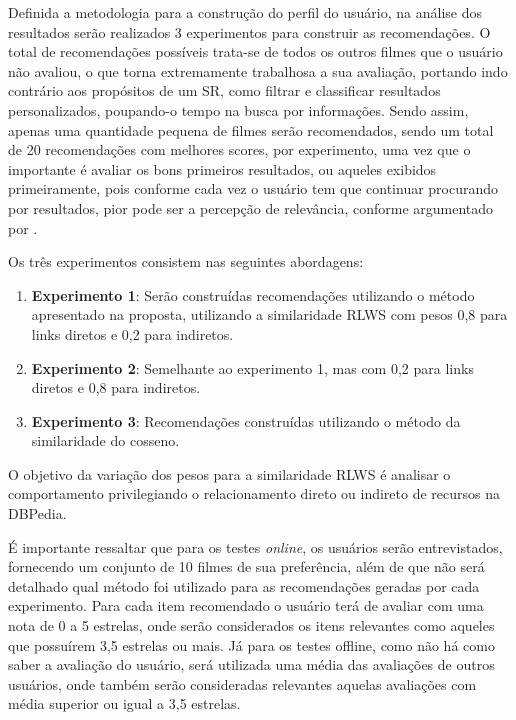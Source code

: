 Definida a metodologia para a construção do perfil do usuário, na análise dos resultados serão realizados 3 experimentos para construir as recomendações. O total de recomendações possíveis trata-se de todos os outros filmes que o usuário não avaliou, o que torna extremamente trabalhosa a sua avaliação, portando indo contrário aos propósitos de um \ac{SR}, como filtrar e classificar resultados personalizados, poupando-o tempo na busca por informações. Sendo assim, apenas uma quantidade pequena de filmes serão recomendados, sendo um total de 20 recomendações com melhores scores, por experimento, uma vez que o importante é avaliar os bons primeiros resultados, ou aqueles exibidos primeiramente, pois conforme cada vez o usuário tem que continuar procurando por resultados, pior pode ser a percepção de relevância, conforme argumentado por \cite{Manning:2008}. 

Os três experimentos consistem nas seguintes abordagens:

\begin{enumerate}
	\item{\textbf{Experimento 1}: Serão construídas recomendações utilizando o método apresentado na proposta, utilizando a similaridade \ac{RLWS} com pesos 0,8 para links diretos e 0,2 para indiretos.}
	\item{\textbf{Experimento 2}: Semelhante ao experimento 1, mas com 0,2 para links diretos e 0,8 para indiretos.}
	\item{\textbf{Experimento 3}: Recomendações construídas utilizando o método da similaridade do cosseno.}
\end{enumerate}

O objetivo da variação dos pesos para a similaridade \ac{RLWS} é analisar o comportamento privilegiando o relacionamento direto ou indireto de recursos na DBPedia.
 
É importante ressaltar que para os testes \textit{online}, os usuários serão entrevistados, fornecendo um conjunto de 10 filmes de sua preferência, além de que não será detalhado qual método foi utilizado para as recomendações geradas por cada experimento. Para cada item recomendado o usuário terá de avaliar com uma nota de 0 a 5 estrelas, onde serão considerados os itens relevantes como aqueles que possuírem 3,5 estrelas ou mais. Já para os testes offline, como não há como saber a avaliação do usuário, será utilizada uma média das avaliações de outros usuários, onde também serão consideradas relevantes aquelas avaliações com média superior ou igual a 3,5 estrelas.


